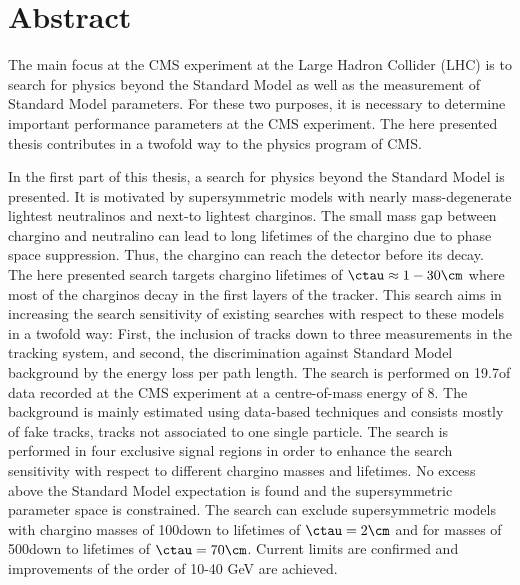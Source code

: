 \chapter*{Abstract}

The main focus at the CMS experiment at the Large Hadron Collider (LHC) is to search for physics beyond the Standard Model as well as the measurement of Standard Model parameters.
For these two purposes, it is necessary to determine important performance parameters at the CMS experiment.
The here presented thesis contributes in a twofold way to the physics program of CMS.

In the first part of this thesis, a search for physics beyond the Standard Model is presented.
It is motivated by supersymmetric models with nearly mass-degenerate lightest neutralinos and next-to lightest charginos.
The small mass gap between chargino and neutralino can lead to long lifetimes of the chargino due to phase space suppression.
Thus, the chargino can reach the detector before its decay.
The here presented search targets chargino lifetimes of $\ctau \approx 1 - 30\cm $ where most of the charginos decay in the first layers of the tracker. 
This search aims in increasing the search sensitivity of existing searches with respect to these models in a twofold way: First, the inclusion of tracks down to three measurements in the tracking system, and second, the discrimination against Standard Model background by the energy loss per path length.
The search is performed on 19.7\fbinv of data recorded at the CMS experiment at a centre-of-mass energy of 8\tev.
The background is mainly estimated using data-based techniques and consists mostly of fake tracks, \ie tracks not associated to one single particle.
The search is performed in four exclusive signal regions in order to enhance the search sensitivity with respect to different chargino masses and lifetimes.
No excess above the Standard Model expectation is found and the supersymmetric parameter space is constrained.
The search can exclude supersymmetric models with chargino masses of 100\gev down to lifetimes of $\ctau=2\cm$ and for masses of 500\gev down to lifetimes of $\ctau=70\cm$.
Current limits are confirmed and improvements of the order of 10-40 GeV are achieved.

